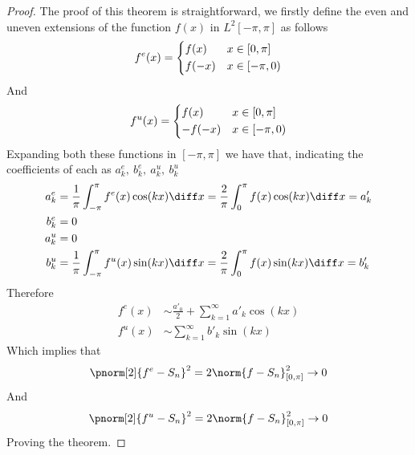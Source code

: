 \documentclass[../mmf.tex]{subfiles}
\begin{document}
\begin{proof}
	The proof of this theorem is straightforward, we firstly define the even and uneven extensions of the function $f(x)$ in $L^2[-\pi,\pi]$ as follows
	\begin{equation*}
		f^e(x)=\begin{dcases}f(x)&x\in[0,\pi]\\f(-x)&x\in[-\pi,0)\end{dcases}
	\end{equation*}
	And
	\begin{equation*}
		f^u(x)=\begin{dcases}f(x)&x\in[0,\pi]\\-f(-x)&x\in[-\pi,0)\end{dcases}
	\end{equation*}
	Expanding both these functions in $[-\pi,\pi]$ we have that, indicating the coefficients of each as $a_k^e,\ b_k^e,\ a_k^u,\ b_k^u$
	\begin{equation*}
		\begin{aligned}
			a_k^e&=\frac{1}{\pi}\int_{-\pi}^{\pi}f^e(x)\cos(kx)\diff x=\frac{2}{\pi}\int_{0}^{\pi}f(x)\cos(kx)\diff x=a'_k\\
			b_k^e&=0\\
			a_k^u&=0\\
			b_k^u&=\frac{1}{\pi}\int_{-\pi}^{\pi}f^u(x)\sin(kx)\diff x=\frac{2}{\pi}\int_{0}^{\pi}f(x)\sin(kx)\diff x=b'_k
		\end{aligned}
	\end{equation*}
	Therefore
	\begin{equation*}
		\begin{aligned}
			f^e(x)&\sim\frac{a'_0}{2}+\sum_{k=1}^{\infty}a'_k\cos(kx)\\
			f^u(x)&\sim\sum_{k=1}^{\infty}b'_k\sin(kx)
		\end{aligned}
	\end{equation*}
	Which implies that
	\begin{equation*}
		\pnorm[2]{f^e-S_n}^2=2\norm{f-S_n}^2_{[0,\pi]}\to0
	\end{equation*}
	And
	\begin{equation*}
		\pnorm[2]{f^u-S_n}^2=2\norm{f-S_n}^2_{[0,\pi]}\to0
	\end{equation*}
	Proving the theorem.
\end{proof}
\end{document}
